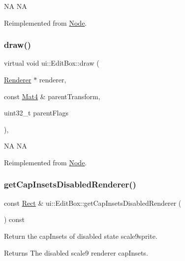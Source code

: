 NA  NA 

Reimplemented from \hyperlink{classNode_abcf85087a15901deb7c6c1231634c8ab}{Node}.

\mbox{\label{classui_1_1EditBox_ab853853be41d8e50e6b23ca1fcb5641f}} 
\subsubsection{\texorpdfstring{draw()}{draw()}\hspace{0.1cm}{\footnotesize\ttfamily [2/2]}}
{\footnotesize\ttfamily virtual void ui\+::\+Edit\+Box\+::draw (\begin{DoxyParamCaption}\item[{\hyperlink{classRenderer}{Renderer} $\ast$}]{renderer,  }\item[{const \hyperlink{classMat4}{Mat4} \&}]{parent\+Transform,  }\item[{uint32\+\_\+t}]{parent\+Flags }\end{DoxyParamCaption})\hspace{0.3cm}{\ttfamily [override]}, {\ttfamily [virtual]}}

NA  NA 

Reimplemented from \hyperlink{classNode_abcf85087a15901deb7c6c1231634c8ab}{Node}.

\mbox{\label{classui_1_1EditBox_aeb3e0e78e2dcb8ffd4fe78dd509c56fe}} 
\subsubsection{\texorpdfstring{get\+Cap\+Insets\+Disabled\+Renderer()}{getCapInsetsDisabledRenderer()}}
{\footnotesize\ttfamily const \hyperlink{classRect}{Rect} \& ui\+::\+Edit\+Box\+::get\+Cap\+Insets\+Disabled\+Renderer (\begin{DoxyParamCaption}{ }\end{DoxyParamCaption}) const}

Return the cap\+Insets of disabled state scale9sprite. \begin{DoxyReturn}{Returns}
The disabled scale9 renderer cap\+Insets. 
\end{DoxyReturn}
\mbox{\label{classui_1_1EditBox_afa9dc82a953be1cae1a1436e868bd459}} 
